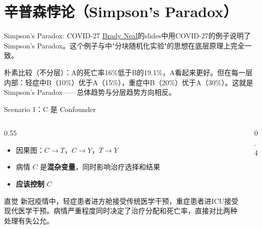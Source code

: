 \section{辛普森悖论（Simpson's Paradox）}

\begin{frame}{Simpson's Paradox: COVID-27}
\href{https://www.youtube.com/playlist?list=PLoazKTcS0RzZ1SUgeOgc6SWt51gfT80N0}{Brady Neal}的slides中用COVID-27的例子说明了Simpson's Paradox。这个例子与\textcite{GLSJ202510012}中"分块随机化实验"的思想在底层原理上完全一致。

\vspace{0.5em}

  

  朴素比较（不分层）：A的死亡率16\%低于B的19.1\%，A看起来更好。但在每一层内部：轻症中B（10\%）优于A（15\%），重症中B（20\%）优于A（30\%）。这就是Simpson's Paradox——总体趋势与分层趋势方向相反。

\vspace{2em}
\end{frame}

\begin{frame}{Scenario 1：C 是 Confounder}

  \begin{columns}[c]
    \begin{column}{0.55\textwidth}
      \begin{itemize}
        \item 因果图：$C \to T$，$C \to Y$，$T \to Y$
        \item 病情 $C$ 是\textbf{混杂变量}，同时影响治疗选择和结果
        \item \textbf{应该控制} $C$
      \end{itemize}

      \medskip

      \begin{exampleblock}{直觉}
        新冠疫情中，轻症患者进方舱接受传统医学干预，重症患者进ICU接受现代医学干预。病情严重程度同时决定了治疗分配和死亡率，直接对比两种处理有失公允。
      \end{exampleblock}
    \end{column}

    \begin{column}{0.4\textwidth}
      \centering
    \end{column}
  \end{columns}

\end{frame}

